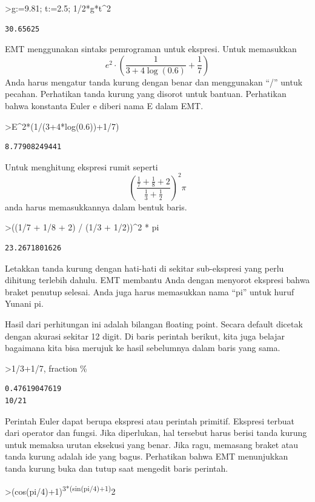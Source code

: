 \documentclass[
]{book}
\begin{document}
\textgreater g:=9.81; t:=2.5; 1/2*g*t\^{}2

\begin{verbatim}
30.65625
\end{verbatim}

EMT menggunakan sintaks pemrograman untuk ekspresi. Untuk memasukkan \[e^2 \cdot \left( \frac{1}{3+4 \log(0.6)}+\frac{1}{7} \right)\]Anda harus mengatur tanda kurung dengan benar dan menggunakan ``/'' untuk pecahan. Perhatikan tanda kurung yang disorot untuk bantuan. Perhatikan bahwa konstanta Euler e diberi nama E dalam EMT.

\textgreater E\^{}2*(1/(3+4*log(0.6))+1/7)

\begin{verbatim}
8.77908249441
\end{verbatim}

Untuk menghitung ekspresi rumit seperti \[\left(\frac{\frac17 + \frac18 + 2}{\frac13 + \frac12}\right)^2 \pi\]anda harus memasukkannya dalam bentuk baris.

\textgreater((1/7 + 1/8 + 2) / (1/3 + 1/2))\^{}2 * pi

\begin{verbatim}
23.2671801626
\end{verbatim}

Letakkan tanda kurung dengan hati-hati di sekitar sub-ekspresi yang perlu dihitung terlebih dahulu. EMT membantu Anda dengan menyorot ekspresi bahwa braket penutup selesai. Anda juga harus memasukkan nama ``pi'' untuk huruf Yunani pi.

Hasil dari perhitungan ini adalah bilangan floating point. Secara default dicetak dengan akurasi sekitar 12 digit. Di baris perintah berikut, kita juga belajar bagaimana kita bisa merujuk ke hasil sebelumnya dalam baris yang sama.

\textgreater1/3+1/7, fraction \%

\begin{verbatim}
0.47619047619
10/21
\end{verbatim}

Perintah Euler dapat berupa ekspresi atau perintah primitif. Ekspresi terbuat dari operator dan fungsi. Jika diperlukan, hal tersebut harus berisi tanda kurung untuk memaksa urutan eksekusi yang benar. Jika ragu, memasang braket atau tanda kurung adalah ide yang bagus. Perhatikan bahwa EMT menunjukkan tanda kurung buka dan tutup saat mengedit baris perintah.

\textgreater(cos(pi/4)+1)\textsuperscript{3*(sin(pi/4)+1)}2
\end{document}
